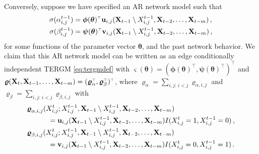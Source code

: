 \documentclass[12pt]{article}
\newcommand{\bvarsigma}{\boldsymbol \varsigma}
\newcommand{\bvarrho}{\boldsymbol \varrho}
\newcommand{\bpsi}{\boldsymbol \psi}
\newcommand{\bphi}{\boldsymbol \phi}
\newcommand{\btheta}{\boldsymbol \theta}
\def\T{{\scriptscriptstyle \top} }
\newcommand{\bu}{{\mathbf u}}
\newcommand{\bv}{{\mathbf v}}
\newcommand{\0}{{\bf 0}}
\begin{document}
Conversely, suppose we have specified an AR network model such that
\begin{align*}
  \sigma(\alpha_{i,j}^{t-1}) &= \bphi(\btheta)^{\T} \bu_{i,j}({\bf X}_{t-1} \setminus X_{i,j}^{t-1}, {\bf X}_{t-2}, \ldots, {\bf X}_{t-m} ) \,,\\
  \sigma(\beta_{i,j}^{t-1}) &= \bpsi(\btheta)^{\T} \bv_{i,j}({\bf X}_{t-1} \setminus X_{i,j}^{t-1}, {\bf X}_{t-2}, \ldots, {\bf X}_{t-m} )\,,
\end{align*}
for some functions of the  parameter vector $\btheta$, and the past network behavior. We claim that this AR network model can be written as an edge conditionally independent TERGM \eqref{eq:tergmdef} with $\bvarsigma(\btheta) = (\bphi(\btheta)^{\T}, \bpsi(\btheta)^{\T})^{\T}$ and $
  \bvarrho({\bf X}_t , {\bf X}_{t-1}, \ldots, {\bf X}_{t-m}) = (\bvarrho_{\alpha}^{\T} , \bvarrho_{\beta}^{\T})^{\T}$, where
$\bvarrho_{\alpha} = \sum_{i,j:\,i < j} \bvarrho_{\alpha,i,j}$ and $\bvarrho_{\beta} = \sum_{i,j:\,i < j} \bvarrho_{\beta,i,j}$ with
\begin{align*}
  &\bvarrho_{\alpha,i,j}(X_{i,j}^t ; X_{i,j}^{t-1}, {\bf X}_{t-1} \setminus X_{i,j}^{t-1}, {\bf X}_{t-2}, \ldots, {\bf X}_{t-m})\\
  &~~~~~~~~~= \bu_{i,j}({\bf X}_{t-1} \setminus X_{i,j}^{t-1}, {\bf X}_{t-2}, \ldots, {\bf X}_{t-m} )I(X_{i,j}^{t}=1, X_{i,j}^{t-1}=0) \,,\\
  &\bvarrho_{\beta,i,j}(X_{i,j}^t ; X_{i,j}^{t-1}, {\bf X}_{t-1} \setminus X_{i,j}^{t-1}, {\bf X}_{t-2}, \ldots, {\bf X}_{t-m}) \\&~~~~~~~~~=\bv_{i,j}({\bf X}_{t-1} \setminus X_{i,j}^{t-1}, {\bf X}_{t-2}, \ldots, {\bf X}_{t-m} )I(X_{i,j}^{t}=0, X_{i,j}^{t-1}=1)\,.
\end{align*}


\end{document}
